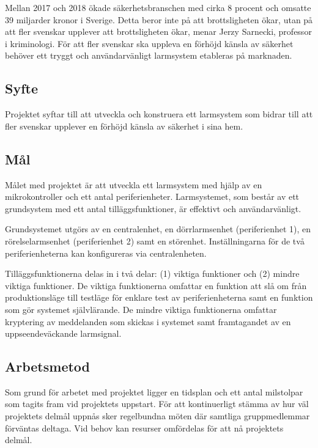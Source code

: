 Mellan 2017 och 2018 ökade säkerhetsbranschen med cirka 8 procent och omsatte 39 miljarder kronor i Sverige.
Detta beror inte på att brottsligheten ökar, utan på att fler svenskar upplever att brottsligheten ökar,
menar Jerzy Sarnecki, professor i kriminologi\cite{sverigesRadio}. För att fler svenskar ska uppleva en förhöjd känsla av säkerhet behöver ett tryggt och användarvänligt larmsystem etableras på marknaden.

\subsection{Syfte}

Projektet syftar till att utveckla och konstruera ett larmsystem
som bidrar till att fler svenskar upplever en förhöjd känsla av säkerhet i sina hem.

\subsection{Mål}

Målet med projektet är att utveckla ett larmsystem med hjälp av en mikrokontroller och ett antal periferienheter.
Larmsystemet, som består av ett grundsystem med ett antal tilläggsfunktioner, är effektivt och användarvänligt.

Grundsystemet utgörs av en centralenhet, en dörrlarmsenhet (periferienhet 1), en rörelselarmsenhet (periferienhet 2) samt en störenhet. Inställningarna för de två periferienheterna kan konfigureras via centralenheten.

Tilläggsfunktionerna delas in i två delar: (1) viktiga funktioner och (2) mindre viktiga funktioner. De viktiga funktionerna omfattar en funktion att slå om från produktionsläge till testläge för enklare test av periferienheterna samt en funktion som gör systemet självlärande.  De mindre viktiga funktionerna omfattar    kryptering av meddelanden som skickas i systemet samt framtagandet av en uppseendeväckande larmsignal.

\subsection{Arbetsmetod}

Som grund för arbetet med projektet ligger en tidsplan och ett antal milstolpar som tagits fram vid projektets uppstart. För att kontinuerligt stämma av hur väl projektets delmål uppnås sker regelbundna möten där samtliga gruppmedlemmar förväntas deltaga. Vid behov kan resurser omfördelas för att nå projektets delmål.

